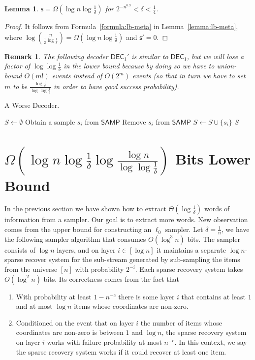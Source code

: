 \documentclass[10pt]{article}
\newtheorem{lemma}{Lemma}
\newtheorem{remark}{Remark}
\newcommand{\samp}{\textsf{SAMP}\xspace}
\newcommand{\dec}{\textsf{DEC}\xspace}
\newcommand{\s}{\textsf{s}\xspace}
\begin{document}
\begin{lemma}
  $\s = \Omega(\log n \log \frac{1}{\delta})$ for $2^{-n^{0.9}}<\delta<\frac{1}{4}$.
\end{lemma}

\begin{proof}
  It follows from Formula~\ref{formula:lb-meta} in Lemma~\ref{lemma:lb-meta}, where $\log {n \choose \frac{1}{2}\log \frac{1}{\delta}}=\Omega(\log n \log \frac{1}{\delta})$ and $\s'=0$. 
\end{proof}

\begin{remark}
  The following decoder $\dec_1'$ is similar to $\dec_1$, but we will lose a factor of $\log\log \frac{1}{\delta}$ in the lower bound because by doing so we have to union-bound $O(m!)$ events instead of $O(2^m)$ events (so that in turn we have to set $m$ to be $\frac{\log \frac{1}{\delta}}{\log\log\frac{1}{\delta}}$ in order to have good success probability). 
\end{remark}

\begin{algorithm}[H]
\caption{A Worse Decoder.}
\begin{algorithmic}[1]
\Procedure{$\dec_1'$}{\samp}
\State $S\leftarrow \emptyset$
\State Obtain a sample $s_i$ from $\samp$
\State Remove $s_i$ from $\samp$
\State $S \leftarrow S \cup \{s_i\}$
\EndFor
\State \Return $S$ 
\EndProcedure
\end{algorithmic}
\end{algorithm}


\section{$\Omega(\log n \log {\frac{1}{\delta}} \log \frac{\log n}{\log\log \frac{1}{\delta}})$ Bits Lower Bound}

In the previous section we have shown how to extract $\Theta(\log \frac{1}{\delta})$ words of information from a sampler. 
Our goal is to extract more words. New observation comes from the upper bound for constructing an $\ell_0$ sampler. 
Let $\delta=\frac{1}{n}$, we have the following sampler algorithm that consumes $O(\log^3 n)$ bits. 
The sampler consists of $\log n$ layers, and on layer $i\in [\log n]$ it maintains a separate $\log n$-sparse recover system for the sub-stream generated by sub-sampling the items from the universe $[n]$ with probability $2^{-i}$.
Each sparse recovery system takes $O(\log^2 n)$ bits. 
Its correctness comes from the fact that 
\begin{enumerate}
\item With probability at least $1-n^{-c}$ there is some layer $i$ that contains at least $1$ and at most $\log n$ items whose coordinates are non-zero. 
\item Conditioned on the event that on layer $i$ the number of items whose coordinates are non-zero is between $1$ and $\log n$, the sparse recovery system on layer $i$ works with failure probability at most $n^{-c}$. In this context, we say the sparse recovery system works if it could recover at least one item. 
\end{enumerate}
\end{document}
